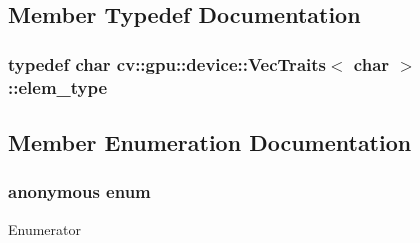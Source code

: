 \subsection{Member Typedef Documentation}
\hypertarget{structcv_1_1gpu_1_1device_1_1VecTraits_3_01char_01_4_a001146e7c1cdebf4d140ef7a279491b4}{
\subsubsection[{elem\-\_\-type}]{\setlength{\rightskip}{0pt plus 5cm}typedef char {\bf cv\-::gpu\-::device\-::\-Vec\-Traits}$<$ char $>$\-::{\bf elem\-\_\-type}}}\label{structcv_1_1gpu_1_1device_1_1VecTraits_3_01char_01_4_a001146e7c1cdebf4d140ef7a279491b4}


\subsection{Member Enumeration Documentation}
\hypertarget{structcv_1_1gpu_1_1device_1_1VecTraits_3_01char_01_4_aeb356ffe14fad0be200363ee6ea20262}{\subsubsection[{anonymous enum}]{\setlength{\rightskip}{0pt plus 5cm}anonymous enum}}\label{structcv_1_1gpu_1_1device_1_1VecTraits_3_01char_01_4_aeb356ffe14fad0be200363ee6ea20262}
\begin{Desc}
\item[Enumerator]\par
\begin{description}
\item[{\em 
\hypertarget{structcv_1_1gpu_1_1device_1_1VecTraits_3_01char_01_4_aeb356ffe14fad0be200363ee6ea20262aeb59ca53978f0d005ae3909b5b4f0ad8}{cn}\label{structcv_1_1gpu_1_1device_1_1VecTraits_3_01char_01_4_aeb356ffe14fad0be200363ee6ea20262aeb59ca53978f0d005ae3909b5b4f0ad8}
}]\end{description}
\end{Desc}


